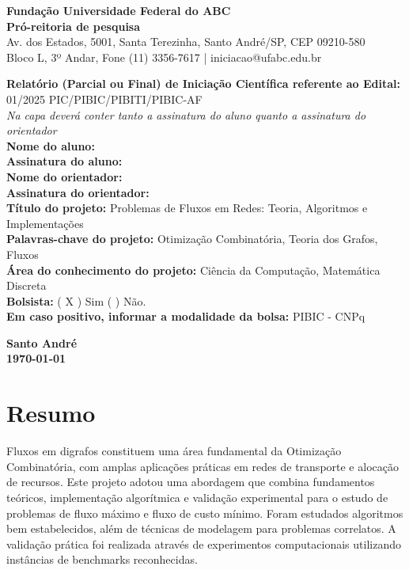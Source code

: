 \documentclass[12pt,a4paper]{article}
\begin{document}
\onehalfspacing

\begin{center}
    \textbf{Fundação Universidade Federal do ABC}\\
    \textbf{Pró-reitoria de pesquisa}\\
    \small Av. dos Estados, 5001, Santa Terezinha, Santo André/SP, CEP 09210-580\\
    Bloco L, 3º Andar, Fone (11) 3356-7617 | iniciacao@ufabc.edu.br
\end{center}
\vspace{0.8cm}

\noindent \textbf{Relatório (Parcial ou Final) de Iniciação Científica referente ao Edital:} 01/2025 PIC/PIBIC/PIBITI/PIBIC-AF \\[0.5cm]
\noindent \emph{Na capa deverá conter tanto a assinatura do aluno quanto a assinatura do orientador}\\[0.5cm]
\noindent \textbf{Nome do aluno:} \hrulefill \\
\noindent \textbf{Assinatura do aluno:} \hrulefill \\[0.5cm]
\noindent \textbf{Nome do orientador:} \hrulefill \\
\noindent \textbf{Assinatura do orientador:} \hrulefill \\[0.5cm]
\noindent \textbf{Título do projeto:} Problemas de Fluxos em Redes: Teoria, Algoritmos e Implementações \\[0.5cm]
\noindent \textbf{Palavras-chave do projeto:} Otimização Combinatória, Teoria dos Grafos, Fluxos \\[0.5cm]
\noindent \textbf{Área do conhecimento do projeto:} Ciência da Computação, Matemática Discreta \\[0.5cm]
\noindent \textbf{Bolsista:} ( X ) Sim \quad ( \quad ) Não. \\
\textbf{Em caso positivo, informar a modalidade da bolsa:} PIBIC - CNPq \\[1cm]

\begin{center}
    \textbf{Santo André}\\
    \textbf{\today}
\end{center}

\vspace{1cm}

\renewcommand{\contentsname}{Sumário}
\tableofcontents
\newpage

\section{Resumo}
Fluxos em digrafos constituem uma área fundamental da Otimização Combinatória, com amplas aplicações práticas em redes de transporte e alocação de recursos. Este projeto adotou uma abordagem que combina fundamentos teóricos, implementação algorítmica e validação experimental para o estudo de problemas de fluxo máximo e fluxo de custo mínimo. Foram estudados algoritmos bem estabelecidos, além de técnicas de modelagem para problemas correlatos. A validação prática foi realizada através de experimentos computacionais utilizando instâncias de benchmarks reconhecidas.
\end{document}
